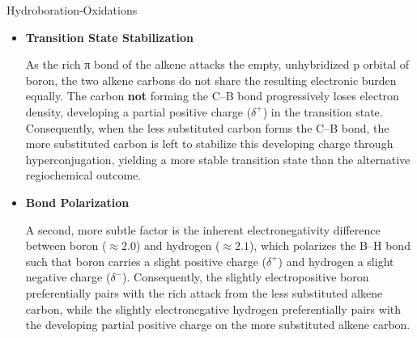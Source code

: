 \documentclass[10pt]{article}
\begin{document}
\begin{core}[label=core:alkene_hydro_oxi]{Hydroboration-Oxidations}
\begin{enumerate}[label=(\arabic*)]
          \begin{itemize}

            \item \textbf{Transition State Stabilization}

            As the  rich π bond of the alkene attacks the empty, unhybridized p orbital of boron, the two alkene carbons do not share the resulting electronic burden equally. The carbon \textbf{not} forming the C--B bond progressively loses electron density, developing a partial positive charge ($\delta^+$) in the transition state. Consequently, when the less substituted carbon forms the C--B bond, the more substituted carbon is left to stabilize this developing charge through hyperconjugation, yielding a more stable transition state than the alternative regiochemical outcome.


            \item \textbf{Bond Polarization}

            A second, more subtle factor is the inherent electronegativity difference between boron ($\approx 2.0$) and hydrogen ($\approx 2.1$), which polarizes the B--H bond such that boron carries a slight positive charge ($\delta^+$) and hydrogen a slight negative charge ($\delta^-$). Consequently, the slightly electropositive boron preferentially pairs with the  rich attack from the less substituted alkene carbon, while the slightly electronegative hydrogen preferentially pairs with the developing partial positive charge on the more substituted alkene carbon.

          \end{itemize}


\end{enumerate}
\end{core}
\end{document}
